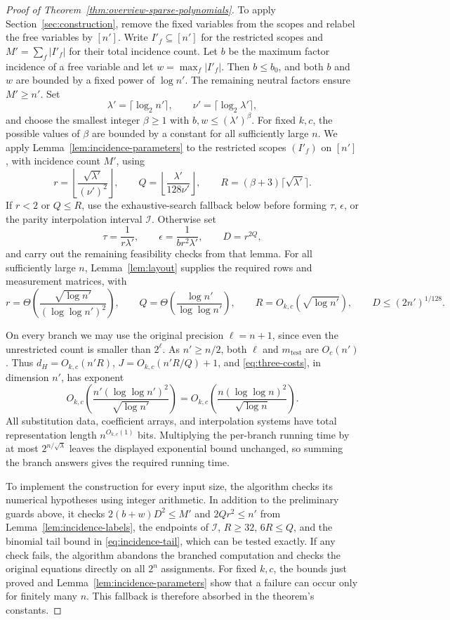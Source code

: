 \begin{proof}[Proof of Theorem~\ref{thm:overview-sparse-polynomials}]
To apply Section~\ref{sec:construction}, remove the fixed variables from the
scopes and relabel the free variables by $[n']$.
Write $I'_f\subseteq[n']$ for the restricted
scopes and $M'=\sum_f|I'_f|$ for their total incidence count.
Let $b$ be the maximum factor incidence of a free variable
and let $w=\max_f|I'_f|$. Then $b\le b_0$,
and both $b$ and $w$ are bounded by a fixed power of $\log n'$.
The remaining neutral factors ensure $M'\ge n'$.
Set
\[
 \lambda'=\lceil\log_2 n'\rceil,\qquad
 \nu'=\lceil\log_2\lambda'\rceil,
\]
and choose the smallest integer $\beta\ge1$ with
$b,w\le(\lambda')^\beta$. For fixed $k,c$, the possible values
of $\beta$ are bounded by a constant for all sufficiently large
$n$. We apply Lemma~\ref{lem:incidence-parameters} to the restricted
scopes $(I'_f)$ on $[n']$, with incidence count $M'$, using
\[
 r=\left\lfloor\frac{\sqrt{\lambda'}}{(\nu')^2}\right\rfloor,
 \qquad Q=\left\lfloor\frac{\lambda'}{128\nu'}\right\rfloor,
 \qquad R=(\beta+3)\lceil\sqrt{\lambda'}\rceil.
\]
If $r<2$ or $Q\le R$, use the exhaustive-search fallback below
before forming $\tau$, $\epsilon$, or the parity interpolation
interval $\mathcal I$.
Otherwise set
\[
 \tau=\frac1{r\lambda'},\qquad
 \epsilon=\frac1{br^2\lambda'},\qquad D=r^{2Q},
\]
and carry out the remaining feasibility checks from that lemma.
For all sufficiently large $n$, Lemma~\ref{lem:layout} supplies
the required rows and measurement matrices, with
\[
 r=\Theta\!\left(\frac{\sqrt{\log n'}}{(\log\log n')^2}\right),
 \qquad Q=\Theta\!\left(\frac{\log n'}{\log\log n'}\right),
 \qquad R=O_{k,c}(\sqrt{\log n'}),
 \qquad D\le(2n')^{1/128}.
\]

On every branch we may use the original precision $\ell=n+1$,
since even the unrestricted count is smaller than $2^\ell$. As
$n'\ge n/2$, both $\ell$ and $m_{\mathrm{test}}$ are $O_c(n')$.
Thus $d_H=O_{k,c}(n'R)$, $J=O_{k,c}(n'R/Q)+1$, and
\eqref{eq:three-costs}, in dimension $n'$, has exponent
\[
 O_{k,c}\!\left(\frac{n'(\log\log n')^2}{\sqrt{\log n'}}\right)
 =O_{k,c}\!\left(\frac{n(\log\log n)^2}{\sqrt{\log n}}\right).
\]
All substitution data, coefficient arrays, and interpolation systems
have total representation length $n^{O_{k,c}(1)}$ bits.
Multiplying the per-branch running time by at most
$2^{n/\sqrt\lambda}$ leaves the displayed exponential bound
unchanged, so summing the branch answers gives the required running time.

To implement the construction for every input size, the algorithm
checks its numerical hypotheses using integer arithmetic.
In addition to the preliminary guards above, it checks
$2(b+w)D^2\le M'$ and $2Qr^2\le n'$ from
Lemma~\ref{lem:incidence-labels}, the endpoints of $\mathcal I$,
$R\ge32$, $6R\le Q$, and the binomial tail bound in
\eqref{eq:incidence-tail}, which can be tested exactly.
If any check fails, the algorithm abandons the branched computation
and checks the original equations directly on all $2^n$ assignments. For fixed
$k,c$, the bounds just proved and
Lemma~\ref{lem:incidence-parameters} show that a failure can occur
only for finitely many $n$. This fallback is therefore absorbed
in the theorem's constants.


\end{proof}
